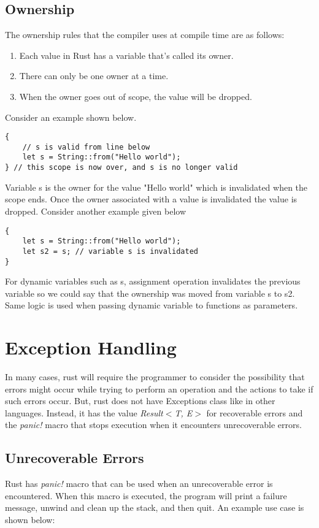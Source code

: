 \documentclass[12pt, titlepage]{article}
\begin{document}
\subsection{Ownership}
The ownership rules that the compiler uses at compile time are as follows\cite{RustOwnership}:
\begin{enumerate}
    \item{Each value in Rust has a variable that’s called its owner.}
    \item{There can only be one owner at a time.}
    \item{When the owner goes out of scope, the value will be dropped.}
\end{enumerate}

Consider an example shown below.
\begin{lstlisting}
{
    // s is valid from line below
    let s = String::from("Hello world");
} // this scope is now over, and s is no longer valid
\end{lstlisting}

Variable s is the owner for the value "Hello world" which is invalidated when the scope ends. Once the owner
associated with a value is invalidated the value is dropped. Consider another example
given below
\begin{lstlisting}
{
    let s = String::from("Hello world");
    let s2 = s; // variable s is invalidated
}
\end{lstlisting}
For dynamic variables such as s, assignment operation invalidates the previous
variable so we could say that the ownership was moved from variable s to s2. Same logic is used when
passing dynamic variable to functions as parameters.

\section{Exception Handling}
In many cases, rust will require the programmer to consider the possibility that
errors might occur while trying to perform an operation and the actions to take
if such errors occur. But, rust does not have Exceptions class
like in other languages. Instead, it has the value \textit{Result$<$T, E$>$} for
recoverable errors and the \textit{panic!} macro that stops execution
when it encounters unrecoverable errors\cite{RustErrorHandling}.

\subsection{Unrecoverable Errors}
Rust has \textit{panic!} macro that can be used when an unrecoverable error is encountered. When
this macro is executed, the program will print a failure message, unwind and clean up the stack,
and then quit\cite{RustPanic}. An example use case is shown below:
\end{document}
